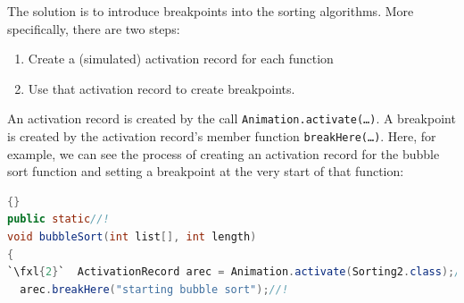 \documentclass[11pt,titlepage]{book}
\def\fxl#1{%
\newdimen\fxlheight\setlength{\fxlheight}{#1\baselineskip}%
\advance\fxlheight by -0.5\baselineskip%
\begin{picture}(0,0)%
\setlength{\unitlength}{\baselineskip}%
\put(0,0){\makebox(0,0.75)[tl]{%
\colorbox{paleyellow}{%
\rule{0pt}{\fxlheight}%
\rule{\linewidth}{0pt}}%
}}\end{picture}%
}
\begin{document}
The solution is to introduce breakpoints into the sorting algorithms.
More specifically, there are two steps:
\begin{enumerate}
\item Create a (simulated) activation record for each function
\item Use that activation record to create breakpoints.
\end{enumerate}
An activation record is created by the call \texttt{Animation.activate(\ldots)}. A breakpoint is created by the activation record's member function \texttt{breakHere(\ldots)}. Here, for example, we can see the process of creating an activation record for the bubble sort function and setting a breakpoint at the very start of that function:
\begin{lstlisting}[language=Java,frame=tb]{}
public static//!
void bubbleSort(int list[], int length)
{
`\fxl{2}`  ActivationRecord arec = Animation.activate(Sorting2.class);//!
  arec.breakHere("starting bubble sort");//!
\end{lstlisting}
\end{document}
